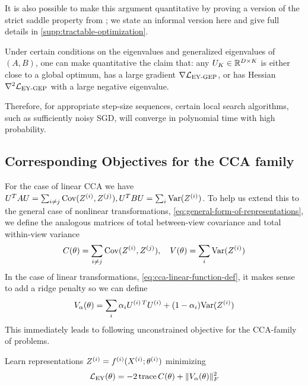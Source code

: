 It is also possible to make this argument quantitative by proving a version of the strict saddle property from \cite{ge_no_2017,ge2015escaping}; we state an informal version here and give full details in \cref{supp:tractable-optimization}.

\begin{corollary}
    Under certain conditions on the eigenvalues and generalized eigenvalues of $(A,B)$, one can make quantitative the claim that:
    any $U_K \in \mathbb{R}^{D \times K}$ is either close to a global optimum, has a large gradient $\nabla \mathcal{L}_\text{EY-GEP}$, or has Hessian $\nabla^2 \mathcal{L}_\text{EY-GEP}$ with a large negative eigenvalue.

    Therefore, for appropriate step-size sequences, certain local search algorithms, such as sufficiently noisy SGD, will converge in polynomial time with high probability.
\end{corollary}

\subsection{Corresponding Objectives for the CCA family}
For the case of linear CCA we have $U^T A U = \sum_{i \neq j} \mathrm{Cov}(Z^{(i)}, Z^{(j)}), U^T B U = \sum_{i} \mathrm{Var}(Z^{(i)})$.
To help us extend this to the general case of nonlinear transformations, \cref{eq:general-form-of-representations}, we define the analogous matrices of total between-view covariance and total within-view variance
\begin{align}\label{eq:def-C-V-matrices}
\vphantom{\bigl(\bigr)} %
C(\theta) = \sum_{i \neq j} \Cov(Z\sps{i}, Z\sps{j}), \quad
V(\theta) = \sum_{i} \Var(Z\sps{i})
\end{align}
In the case of linear transformations, \cref{eq:cca-linear-function-def}, it makes sense to add a ridge penalty so we can define
\begin{align}\label{eq:v-alpha-ridge-definition}
V_\alpha(\theta) = \sum_i \alpha_i {U^{(i)\,T}} U^{(i)} +  (1 - \alpha_i) \mathrm{Var}(Z^{(i)})
\end{align}
This immediately leads to following unconstrained objective for the CCA-family of problems.
\begin{definition}
    Learn representations $Z^{(i)} = f^{(i)}( X^{(i)}; \theta^{(i)})$ minimizing
    \begin{align}\label{eq:EY-loss-def-C-V}
    \mathcal{L}_\text{EY}(\theta) = - 2 \operatorname{trace} C(\theta) + \lVert V_\alpha(\theta)\rVert_F^2
    \end{align}
\end{definition}

